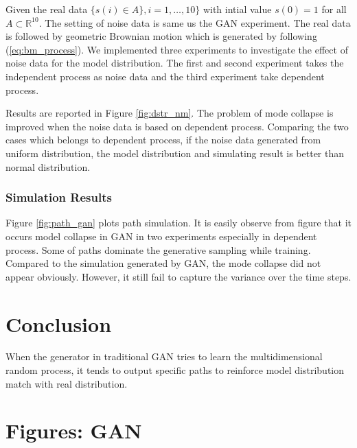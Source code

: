 \documentclass{article}
\begin{document}
	Given the real data $\{ s(i)\in A \}, i = 1, \dots, 10\}$ with intial  value $s(0)=1$ for all $A \subset \mathbb{R}^{10}$.
	The setting of noise data is same us the GAN experiment. 
	The real data is followed by geometric Brownian motion which is generated by following (\ref{eq:bm_process}).
	We implemented three experiments to investigate the effect of noise data for the model distribution.
	The first and second experiment takes the independent process as noise data and the third experiment take dependent process.
	
	Results are reported in Figure \ref{fig:dstr_nm}. 
	The problem of mode collapse is improved when the noise data is based on dependent process.
	Comparing the two cases which belongs to dependent process, if the noise data generated from uniform distribution, the model distribution and simulating result is better than normal distribution. 
	
	
	
	\subsubsection{Simulation Results}
	
	Figure \ref{fig:path_gan} plots path simulation.
	It is easily observe from figure that it occurs model collapse in GAN in two experiments especially in dependent process. 
	Some of paths dominate the generative sampling while training.
	Compared to the simulation generated by GAN, the mode collapse did not appear obviously. 
	However, it still fail to capture the variance over the time steps.
	
	\section{Conclusion}
	
	When the generator in traditional GAN tries to learn the multidimensional random process, it tends to output specific paths to reinforce model distribution match with real distribution. 
	
	

	
	

	
	
	
	
	
	
	\cleardoublepage
	\appendix
	
	\section{Figures: GAN}
	
\end{document}
